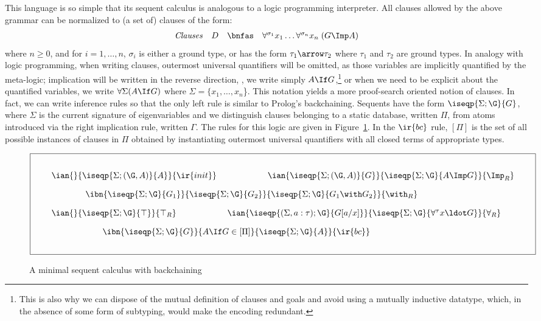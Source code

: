 \documentclass[final]{svjour3}
\begin{document}
This language is so simple that its sequent calculus is analogous to a
logic programming interpreter.  All clauses allowed by the
above grammar can be normalized to (a set of) clauses of the form:
\[ \begin{array}{rrcl}
 \mbox{\textit{Clauses}} & D & \bnfas &
    \forall^{\sigma_1} x_1\ldots\forall^{\sigma_n} x_n\;(G\Imp A)
\end{array} \]
where $n\geq 0$, and
for $i=1,\ldots,n$, $\sigma_i$ is either a ground type, or has
the form $\tau_1\arrow\tau_2$ where $\tau_1$ and $\tau_2$ are ground
types.  In analogy with logic programming, when writing clauses,
outermost universal quantifiers will be omitted, as those variables
are implicitly quantified by the meta-logic; implication will be
written in the reverse direction, \ie, we write simply $A \If
G$,\footnote{This is also why we can dispose of the mutual definition
  of clauses and goals and avoid using a mutually inductive datatype,
  which, in the absence of some form of subtyping, would make the
  encoding redundant.} or when we need to be explicit about the
quantified variables, we write $\forall\Sigma(A \If G)$ where
$\Sigma=\{x_1,\ldots,x_n$\}.  This notation yields a more proof-search
oriented notion of clauses.  In fact, we can write inference rules so
that the only left rule is similar to Prolog's backchaining. Sequents
have the form $\iseqp{\Sigma;\G}{G}$, where $\Sigma$ is the current
signature of eigenvariables and we distinguish clauses belonging to a
static database, written $\Pi$, from atoms introduced via the right
implication rule, written $\Gamma$.  The rules for this logic are
given in Figure~\ref{fig:minlogbc}.  In the $\ir{bc}$ rule,
$[\Pi]$ is the set of all possible instances of clauses in $\Pi$
obtained by instantiating outermost universal quantifiers with all
closed terms of appropriate types.

\begin{figure}  \centering
  \[ {\fboxsep=7mm\fbox{$\begin{array}{l}
 \ian{}{\iseqp{\Sigma;(\G,A)}{A}}{\ir{init}} 
\qquad\qquad\qquad
 \ian{\iseqp{\Sigma;(\G, A)}{G}}
     {\iseqp{\Sigma;\G}{A\Imp G}}
     {\Imp_R} \\[1em]
\qquad\qquad \ibn{\iseqp{\Sigma;\G}{G_1}}{\iseqp{\Sigma;\G}{G_2}} 
     {\iseqp{\Sigma;\G}{G_1\with G_2}}{\with_R}\\[1em]
  \ian{}{\iseqp{\Sigma;\G}{\top}}{\top_R}
\qquad\qquad\qquad
  \ian{\iseqp{(\Sigma, a : \tau);\G}{G[a/x]}}{\iseqp{\Sigma;\G}{\forall^\tau x  \ldot G}} {\forall_R} \\[1em]
\qquad\qquad\qquad
  \ibn{\iseqp{\Sigma;\G}{G}}{ A \If G \in [\Pi]}
      {\iseqp{\Sigma;\G}{A}}
      {\ir{bc}}
\end{array}$}} \]
  \caption{A minimal sequent calculus with backchaining}
  \label{fig:minlogbc}
\end{figure}
\end{document}
